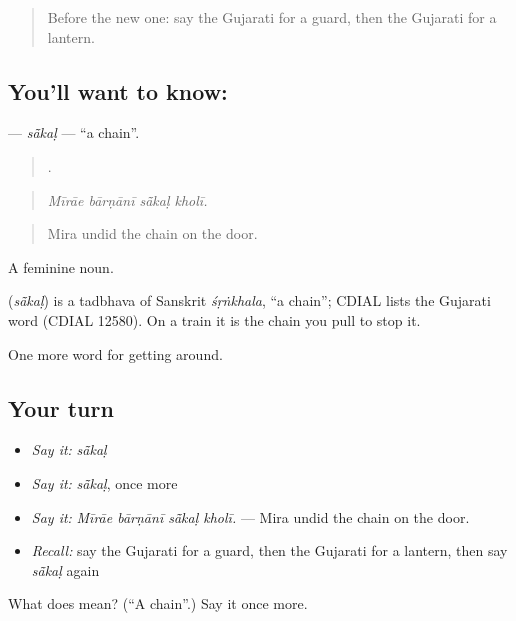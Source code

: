 \begin{quote}
Before the new one: say the Gujarati for a guard, then the Gujarati for a lantern.
\end{quote}

\subsection*{You'll want to know: }
\textbf{} — \emph{sā̃kaḷ} — \textquotedblleft{}a chain\textquotedblright{}.

\begin{quote}
   .
\end{quote}

\begin{quote}
\emph{Mīrāe bārṇānī sā̃kaḷ kholī.}
\end{quote}

\begin{quote}
Mira undid the chain on the door.
\end{quote}

A feminine noun.

\begin{cousinweb}
\textbf{} (\emph{sā̃kaḷ}) is a tadbhava of Sanskrit \emph{śṛṅkhala}, \textquotedblleft{}a chain\textquotedblright{}; CDIAL lists the Gujarati word (CDIAL 12580). On a train it is the chain you pull to stop it.
\end{cousinweb}

\begin{grammarlens}[title={What you've built}]
One more word for getting around.
\end{grammarlens}

\subsection*{Your turn}
\begin{itemize}
\raggedright
  \item \emph{Say it:} \emph{sā̃kaḷ}
  \item \emph{Say it:} \emph{sā̃kaḷ}, once more
  \item \emph{Say it:} \emph{Mīrāe bārṇānī sā̃kaḷ kholī.} — Mira undid the chain on the door.
  \item \emph{Recall:} say the Gujarati for a guard, then the Gujarati for a lantern, then say \emph{sā̃kaḷ} again
\end{itemize}

\begin{tcolorbox}[breakable,colback=teal!4,colframe=teal!35!black,title={Before you move on}]
What does  mean? (\textquotedblleft{}A chain\textquotedblright{}.) Say it once more.
\end{tcolorbox}
